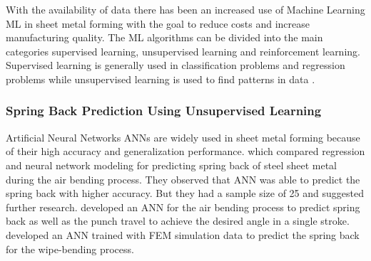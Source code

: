 


With the availability of data there has been an increased use of Machine Learning \ac{ML} in sheet metal forming with the goal to reduce costs and increase manufacturing quality.
\cite{bock_reviewapplicationmachine_2019} \cite[]{cao_manufacturingadvancedsmart_2019} %
The ML algorithms can be divided into the main categories supervised learning, unsupervised learning and reinforcement learning. \cite[]{liu_reinforcementlearningfreeform_2020}
Supervised learning is generally used in classification problems and regression problems while unsupervised learning is used to find patterns in data \cite[p. 2]{cruz_applicationmachinelearning_2021}.

\subsubsection*{Spring Back Prediction Using Unsupervised Learning}
Artificial Neural Networks \ac{ANN}s are widely used in sheet metal forming because of their high accuracy and generalization performance. \cite[p. 2]{cruz_applicationmachinelearning_2021} \cite[]{narayanasamy_comparisonregressionartificial_2012a} which compared regression and neural network modeling for predicting spring back of steel sheet metal during the air bending process.  
They observed that ANN was able to predict the spring back with higher accuracy. But they had a sample size of 25 and suggested further research. 
\cite[]{inamdar_developmentartificialneural_2000} developed an ANN for the air bending process to predict spring back as well as the punch travel to achieve the desired angle in a single stroke.
\cite[]{kazan_predictionspringbackwipebending_2009} developed an ANN trained with FEM simulation data to predict the spring back for the wipe-bending process.


